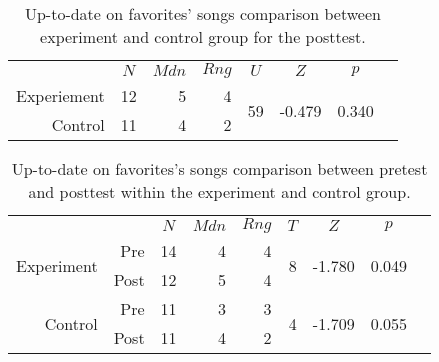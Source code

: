 \begin{table}[!h]
  \begin{tabular}{rrrrrrrr}

    &
    \multicolumn{1}{c}{$N$} &
    \multicolumn{1}{c}{$Mdn$} &
    \multicolumn{1}{c}{$Rng$} &
    \multicolumn{1}{c}{$U$} &
    \multicolumn{1}{c}{$Z$} &
    \multicolumn{1}{c}{$p$} \\

    \cmidrule(lr){2-7}

    Experiement &
    12 &
    5 &
    4 &
    \multirow{2}{*}{59} &
    \multirow{2}{*}{-0.479} &
    \multirow{2}{*}{0.340}\\

    Control &
    11 &
    4 &
    2 &
    &
    \\

  \end{tabular}
  \caption[Up-to-date on Favorites' Songs, Between Groups]{%
    Up-to-date on favorites' songs comparison between
    experiment and control group for the posttest.
  }
  \label{table:uptodate.songs}
\end{table}

\begin{table}[!h]
  \begin{tabular}{rrrrrrrrr}

    &
    &
    \multicolumn{1}{c}{$N$} &
    \multicolumn{1}{c}{$Mdn$} &
    \multicolumn{1}{c}{$Rng$} &
    \multicolumn{1}{c}{$T$} &
    \multicolumn{1}{c}{$Z$} &
    \multicolumn{1}{c}{$p$} \\

    \cmidrule(lr){3-8}

    \multirow{2}{*}{Experiment} &
    Pre &
    14 &
    4 &
    4 &
    \multirow{2}{*}{8} &
    \multirow{2}{*}{-1.780} &
    \multirow{2}{*}{0.049}\\

    &
    Post &
    12 &
    5 &
    4 &
    &
    \\

    \cmidrule(lr){2-8}

    \multirow{2}{*}{Control} &
    Pre &
    11 &
    3 &
    3 &
    \multirow{2}{*}{4} &
    \multirow{2}{*}{-1.709} &
    \multirow{2}{*}{0.055}\\

    &
    Post &
    11 &
    4 &
    2 &
    &
    \\

  \end{tabular}
  \caption[Up-to-date on Favorites' Songs, Within Groups]{%
    Up-to-date on favorites's songs comparison between
    pretest and posttest within the experiment and control group.
  }
\end{table}

